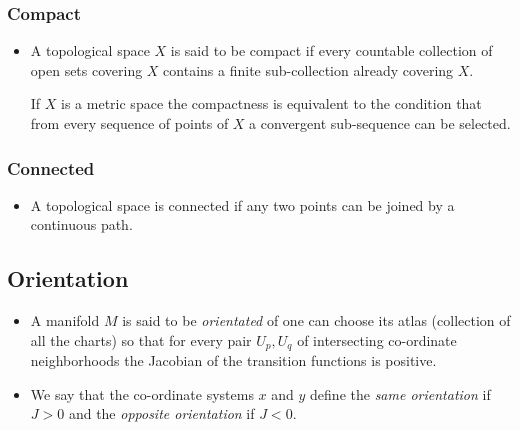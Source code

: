 \documentclass[11pt]{article}
\numberwithin{equation}{section}
\begin{document}
\subsubsection{Compact}
\begin{itemize}
  \item A topological space $X$ is said to be compact if every countable collection of open sets covering $X$ contains a finite sub-collection already covering $X$.

  If $X$ is a metric space the compactness is equivalent to the condition that from every sequence of points of $X$ a convergent sub-sequence can be selected.  
\end{itemize}
\subsubsection{Connected}
\begin{itemize}
  \item A topological space is connected if any two points can be joined by a continuous path. 
\end{itemize}

\subsection{Orientation}
\begin{itemize}
  \item A manifold $M$ is said to be \emph{orientated} of one can choose its atlas (collection of all the charts) so that for every pair $U_{p},U_{q}$ of intersecting co-ordinate neighborhoods the Jacobian of the transition functions is positive.  

  \item We say that the co-ordinate systems $x$ and $y$ define the \emph{same orientation} if $J>0$ and the \emph{opposite orientation} if $J<0$. 
\end{itemize}
\end{document}

